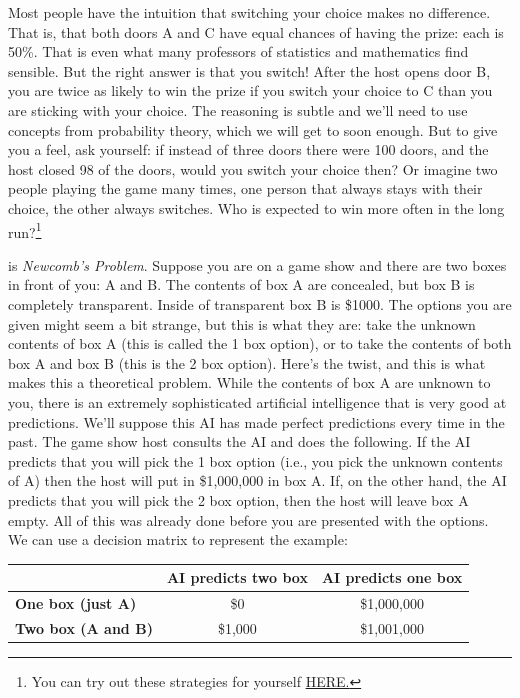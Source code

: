\documentclass[]{tufte-book}
\begin{document}
Most people have the intuition that switching your choice makes no difference. That is, that both doors A and C have equal chances of having the prize: each is 50\%. That is even what many professors of statistics and mathematics find sensible. But the right answer is that you switch! After the host opens door B, you are twice as likely to win the prize if you switch your choice to C than you are sticking with your choice. The reasoning is subtle and we'll need to use concepts from probability theory, which we will get to soon enough. But to give you a feel, ask yourself: if instead of three doors there were 100 doors, and the host closed 98 of the doors, would you switch your choice then? Or imagine two people playing the game many times, one person that always stays with their choice, the other always switches. Who is expected to win more often in the long run?\footnote{You can try out these strategies for yourself \href{http://www.rossmanchance.com/applets/2021/montyhall/Monty.html}{HERE.}}

 is \emph{Newcomb's Problem}. Suppose you are on a game show and there are two boxes in front of you: A and B. The contents of box A are concealed, but box B is completely transparent. Inside of transparent box B is \$1000. The options you are given might seem a bit strange, but this is what they are: take the unknown contents of box A (this is called the 1 box option), or to take the contents of both box A and box B (this is the 2 box option). Here's the twist, and this is what makes this a theoretical problem. While the contents of box A are unknown to you, there is an extremely sophisticated artificial intelligence that is very good at predictions. We'll suppose this AI has made perfect predictions every time in the past. The game show host consults the AI and does the following. If the AI predicts that you will pick the 1 box option (i.e., you pick the unknown contents of A) then the host will put in \$1,000,000 in box A. If, on the other hand, the AI predicts that you will pick the 2 box option, then the host will leave box A empty. All of this was already done before you are presented with the options. We can use a decision matrix to represent the example:

\begin{longtable}[]{@{}lcc@{}}
\toprule
& AI predicts two box & AI predicts one box\tabularnewline
\midrule
\endhead
\textbf{One box (just A)} & \$0 & \$1,000,000\tabularnewline
\textbf{Two box (A and B)} & \$1,000 & \$1,001,000\tabularnewline
\bottomrule
\end{longtable}
\end{document}
